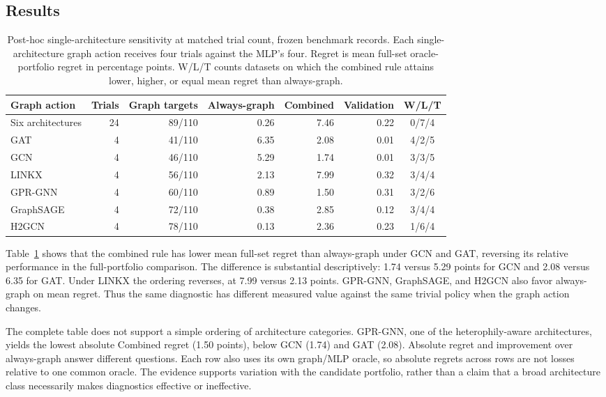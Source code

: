 \subsection{Results}


\begin{table}[t]
\centering
\caption{Post-hoc single-architecture sensitivity at matched trial count, frozen benchmark records. Each single-architecture graph action receives four trials against the MLP's four. Regret is mean full-set oracle-portfolio regret in percentage points. W/L/T counts datasets on which the combined rule attains lower, higher, or equal mean regret than always-graph.}
\label{tab:equal_budget}
\small
\begin{tabular}{@{}lrrrrrc@{}}
\toprule
Graph action & Trials & Graph targets & Always-graph & Combined & Validation & W/L/T \\
\midrule
Six architectures & 24 & 89/110 & 0.26 & 7.46 & 0.22 & 0/7/4 \\
\midrule
GAT & 4 & 41/110 & 6.35 & 2.08 & 0.01 & 4/2/5 \\
GCN & 4 & 46/110 & 5.29 & 1.74 & 0.01 & 3/3/5 \\
LINKX & 4 & 56/110 & 2.13 & 7.99 & 0.32 & 3/4/4 \\
GPR-GNN & 4 & 60/110 & 0.89 & 1.50 & 0.31 & 3/2/6 \\
GraphSAGE & 4 & 72/110 & 0.38 & 2.85 & 0.12 & 3/4/4 \\
H2GCN & 4 & 78/110 & 0.13 & 2.36 & 0.23 & 1/6/4 \\
\bottomrule
\end{tabular}
\end{table}


Table~\ref{tab:equal_budget} shows that the combined rule has lower mean full-set regret than always-graph under GCN and GAT, reversing its relative performance in the full-portfolio comparison. The difference is substantial descriptively: 1.74 versus 5.29 points for GCN and 2.08 versus 6.35 for GAT. Under LINKX the ordering reverses, at 7.99 versus 2.13 points. GPR-GNN, GraphSAGE, and H2GCN also favor always-graph on mean regret. Thus the same diagnostic has different measured value against the same trivial policy when the graph action changes.

The complete table does not support a simple ordering of architecture categories. GPR-GNN, one of the heterophily-aware architectures, yields the lowest absolute Combined regret (1.50 points), below GCN (1.74) and GAT (2.08). Absolute regret and improvement over always-graph answer different questions. Each row also uses its own graph/MLP oracle, so absolute regrets across rows are not losses relative to one common oracle. The evidence supports variation with the candidate portfolio, rather than a claim that a broad architecture class necessarily makes diagnostics effective or ineffective.


